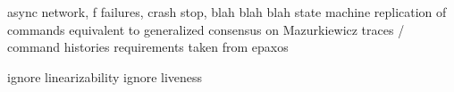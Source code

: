 async network, f failures, crash stop, blah blah blah
state machine replication of commands
equivalent to generalized consensus on Mazurkiewicz traces / command histories
requirements taken from epaxos

ignore linearizability
ignore liveness

